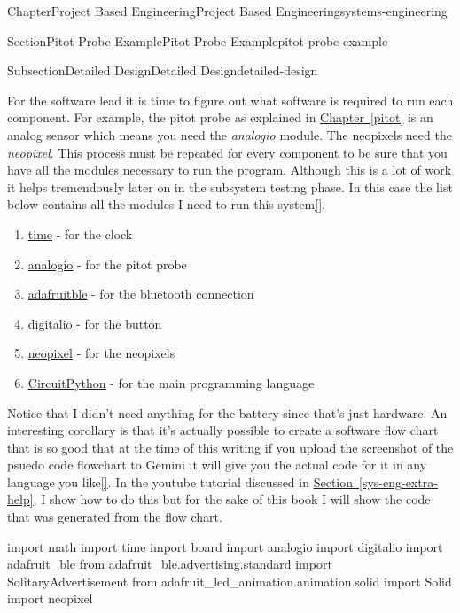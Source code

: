 \documentclass[oneside,10pt,]{book}
\newcommand{\xreffont}{\relax}
\newcommand{\linkhilite}[1]{\underline{#1}}
\numberwithin{equation}{section}
\begin{document}
\begin{chapterptx}{Chapter}{Project Based Engineering}{}{Project Based Engineering}{}{}{systems-engineering}
\begin{sectionptx}{Section}{Pitot Probe Example}{}{Pitot Probe Example}{}{}{pitot-probe-example}
\begin{subsectionptx}{Subsection}{Detailed Design}{}{Detailed Design}{}{}{detailed-design}
\par
For the software lead it is time to figure out what software is required to run each component. For example, the pitot probe as explained in \hyperref[pitot]{\linkhilite{Chapter~{\xreffont\ref{pitot}}}} is an analog sensor which means you need the \emph{analogio} module. The neopixels need the \emph{neopixel}. This process must be repeated for every component to be sure that you have all the modules necessary to run the program. Although this is a lot of work it helps tremendously later on in the subsystem testing phase. In this case the list below contains all the modules I need to run this system\hyperlink{CircuitPython}{\linkhilite{[{\xreffont 30}]}}.%
\begin{enumerate}
\item{}\href{https://docs.circuitpython.org/en/latest/shared-bindings/time/}{\linkhilite{time}} - for the clock%
\item{}\href{https://docs.circuitpython.org/en/latest/shared-bindings/analogio/}{\linkhilite{analogio}} - for the pitot probe%
\item{}\href{https://docs.circuitpython.org/projects/ble/en/latest/}{\linkhilite{adafruit\textunderscore{}ble}} - for the bluetooth connection%
\item{}\href{https://docs.circuitpython.org/en/latest/shared-bindings/digitalio/}{\linkhilite{digitalio}} - for the button%
\item{}\href{https://docs.circuitpython.org/projects/neopixel/en/latest/}{\linkhilite{neopixel}} - for the neopixels%
\item{}\href{https://circuitpython.org/}{\linkhilite{CircuitPython}} - for the main programming language%
\end{enumerate}
Notice that I didn't need anything for the battery since that's just hardware. An interesting corollary is that it's actually possible to create a software flow chart that is so good that at the time of this writing if you upload the screenshot of the psuedo code flowchart to Gemini it will give you the actual code for it in any language you like\hyperlink{gemini}{\linkhilite{[{\xreffont 2}]}}. In the youtube tutorial discussed in \hyperref[sys-eng-extra-help]{\linkhilite{Section~{\xreffont\ref{sys-eng-extra-help}}}}, I show how to do this but for the sake of this book I will show the code that was generated from the flow chart.\begin{preformatted}
import math
import time
import board
import analogio
import digitalio
import adafruit_ble
from adafruit_ble.advertising.standard import SolitaryAdvertisement
from adafruit_led_animation.animation.solid import Solid
import neopixel


\end{preformatted}
\end{subsectionptx}
\end{sectionptx}
\end{chapterptx}
\end{document}
